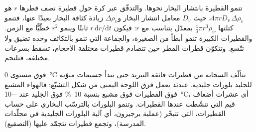 \begin{remark}\label{rem:b2:atmospheric-thermodynamics:growth}
تنمو القطيرة بانتشار البخار نحوها. والتدفّق عبر كرة حول قطيرة
نصف قطرها $r$ هو $4\pi r D_v\,\Delta\rho_v$، حيث $D_v$ معامل انتشار البخار
و$\Delta\rho_v$ زيادة كثافة البخار بعيدًا عنها، فتنمو كتلتها $\tfrac43\pi r^3\rho_w$
بمعدّل يتناسب مع $r$: فيكون $r\,\mathrm{d}r/\mathrm{d}t$ ثابتًا وينمو $r^2$ خطّيًّا مع
الزمن. والقطيرات الكبيرة تنمو أبطأ من الصغيرة، والجماعة التي تنمو بالتكاثف
وحده تضيق ولا تتّسع. وتتكوّن قطرات المطر حين تتصادم قطيرات مختلفة الأحجام، تسقط
بسرعات مختلفة، فتلتحم.
\end{remark}

فوق مستوى \qty{0}{\celsius} تتألّف السحابة من قطيرات فائقة التبريد حتى تبدأ جسيمات منوّية
للجليد بلورات جليدية. عندئذ يعمل فرق اللوحة اليمنى من
شكل التشبّع: فالهواء المشبع فوق القطيرات فوق مشبع بنسبة \qty{10}{\percent} فوق
الجليد عند \qty{-10}{\celsius}، أي عشرات أضعاف قيم  التي تنشّطت عندها القطيرات.
وتنمو البلورات بالترسّب البخاري على حساب القطيرات، التي تتبخّر (عملية
برجيرون، أي آلية البلورات الجليدية في مجلّدات المدرسة)، وتجمع قطيرات تتجمّد
عليها (التصقيع).

